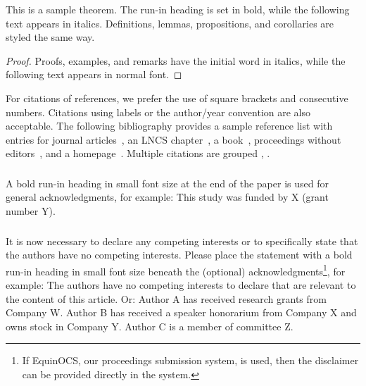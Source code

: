 \documentclass[runningheads]{llncs}
\begin{document}
\begin{theorem}
This is a sample theorem. The run-in heading is set in bold, while
the following text appears in italics. Definitions, lemmas,
propositions, and corollaries are styled the same way.
\end{theorem}
%
%
\begin{proof}
Proofs, examples, and remarks have the initial word in italics,
while the following text appears in normal font.
\end{proof}
For citations of references, we prefer the use of square brackets
and consecutive numbers. Citations using labels or the author/year
convention are also acceptable. The following bibliography provides
a sample reference list with entries for journal
articles~\cite{ref_article1}, an LNCS chapter~\cite{ref_lncs1}, a
book~\cite{ref_book1}, proceedings without editors~\cite{ref_proc1},
and a homepage~\cite{ref_url1}. Multiple citations are grouped
\cite{ref_article1,ref_lncs1,ref_book1},
\cite{ref_article1,ref_book1,ref_proc1,ref_url1}.

\begin{credits}
\subsubsection{\ackname} A bold run-in heading in small font size at the end of the paper is
used for general acknowledgments, for example: This study was funded
by X (grant number Y).

\subsubsection{\discintname}
It is now necessary to declare any competing interests or to specifically
state that the authors have no competing interests. Please place the
statement with a bold run-in heading in small font size beneath the
(optional) acknowledgments\footnote{If EquinOCS, our proceedings submission
system, is used, then the disclaimer can be provided directly in the system.},
for example: The authors have no competing interests to declare that are
relevant to the content of this article. Or: Author A has received research
grants from Company W. Author B has received a speaker honorarium from
Company X and owns stock in Company Y. Author C is a member of committee Z.
\end{credits}
%
%
%


%
\end{document}
